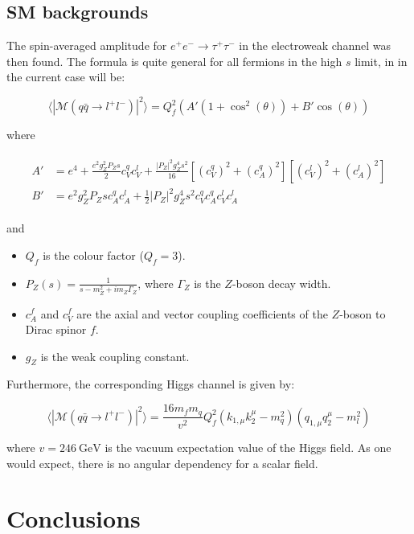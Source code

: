 \documentclass[11pt,a4paper]{article}
\begin{document}
\subsection{SM backgrounds}
The spin-averaged amplitude for $e^+e^- \rightarrow \tau^+\tau^-$ in the electroweak channel was then found. The formula is quite general for all fermions in the high $s$ limit, in in the current case will be:

\begin{equation}
	\langle|\mathcal{M}(q\bar{q}\rightarrow l^+l^-)|^2\rangle = Q_f^2\left(A'\left(1+\cos^2(\theta)\right) + B'\cos(\theta)\right)
\end{equation}

where

\begin{align}
	\begin{split}
	A' &= e^4 + \frac{e^2g_Z^2P_Zs}{2}c_V^qc_V^l + \frac{|P_Z|^2 g_Z^4 s^2}{16}\left[\left(c_V^q\right)^2 + \left(c_A^q\right)^2\right]\left[\left(c_V^l\right)^2 + \left(c_A^l\right)^2\right]\\
	B' &= e^2g_Z^2P_Zsc_A^qc_A^l + \frac{1}{2}|P_Z|^2g_Z^4s^2 c_V^qc_A^qc_V^l c_A^l
	\end{split}
\end{align}

and
\begin{itemize}
	\item $Q_f$ is the colour factor ($Q_f = 3$).
	\item $P_Z(s) = \frac{1}{s-m_Z^2 + im_Z\Gamma_Z}$, where $\Gamma_Z$ is the $Z$-boson decay width.
	\item $c^f_A$ and $c^f_V$ are the axial and vector coupling coefficients of the $Z$-boson to Dirac spinor $f$.
	\item $g_Z$ is the weak coupling constant.
\end{itemize}

Furthermore, the corresponding Higgs channel is given by:

\begin{equation}
	\langle|\mathcal{M}(q\bar{q}\rightarrow l^+l^-)|^2\rangle = \frac{16m_fm_q}{v^2}Q_f^2\left(k_{1,\mu}k_2^\mu - m_q^2\right)\left(q_{1,\mu}q_2^\mu - m_l^2\right)
\end{equation}

where $v=246\:\text{GeV}$ is the vacuum expectation value of the Higgs field. As one would expect, there is no angular dependency for a scalar field.



\section{Conclusions}
\end{document}
